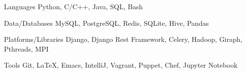 

\begin{cvskills}

  \cvskill
    {Languages} %
    {Python, C/C++, Java, SQL, Bash} %

  \cvskill
    {Data/Databases} %
    {MySQL, PostgreSQL, Redis, SQLite, Hive, Pandas} %

  \cvskill
    {Platforms/Libraries} %
    {Django, Django Rest Framework, Celery, Hadoop, Giraph, Pthreads, MPI}

  \cvskill
    {Tools} %
    {Git, LaTeX, Emacs, IntelliJ, Vagrant, Puppet, Chef, Jupyter Notebook} %

\end{cvskills}
